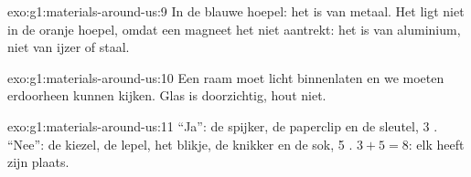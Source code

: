 \begin{solution}{exo:g1:materials-around-us:9}
In de blauwe hoepel: het is van metaal. Het ligt niet in de oranje hoepel,
omdat een magneet het niet aantrekt: het is van aluminium, niet van
ijzer of staal.
\end{solution}

\begin{solution}{exo:g1:materials-around-us:10}
Een raam moet licht binnenlaten en we moeten erdoorheen kunnen kijken.
Glas is doorzichtig, hout niet.
\end{solution}

\begin{solution}{exo:g1:materials-around-us:11}
``Ja'': de spijker, de paperclip en de sleutel, 3 . ``Nee'':
de kiezel, de lepel, het blikje, de knikker en de sok, 5 .
$3 + 5 = 8$: elk  heeft zijn plaats.
\end{solution}
